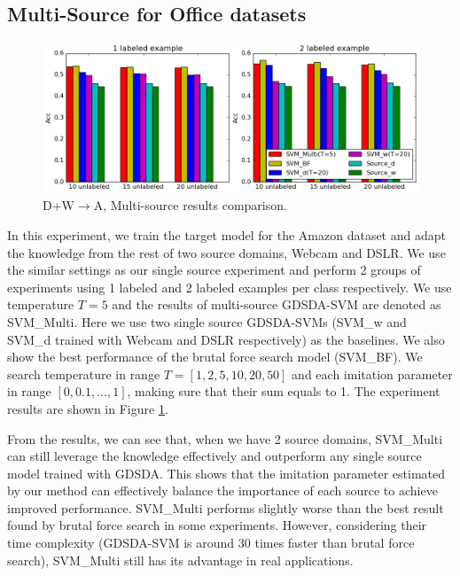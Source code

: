 \subsection{Multi-Source for Office datasets}
\begin{figure}
	\centering
	\includegraphics[scale=.4]{figure/cmp.png}
	\caption{D+W$\rightarrow$A, Multi-source results comparison.}\label{fig:multi}
\end{figure}
In this experiment, we train the target model for the Amazon dataset and adapt the knowledge from the rest of two source domains, Webcam and DSLR.
We use the similar settings as our single source experiment and perform 2 groups of experiments using 1 labeled and 2 labeled examples per class respectively. We use temperature $T=5$ and the results of multi-source GDSDA-SVM are denoted as SVM\_Multi. Here we use two single source GDSDA-SVMs (SVM\_w and SVM\_d trained with Webcam and DSLR respectively) as the baselines. We also show the best performance of the brutal force search model (SVM\_BF). We search temperature in range $T=[1,2,5,10,20,50]$ and each imitation parameter in range $[0,0.1,...,1]$, making sure that their sum equals to 1. The experiment results are shown in Figure \ref{fig:multi}.

From the results, we can see that, when we have 2 source domains, SVM\_Multi can still leverage the knowledge effectively and outperform any single source model trained with GDSDA. This shows that the imitation parameter estimated by our method can effectively balance the importance of each source to achieve improved performance. SVM\_Multi performs slightly worse than the best result found by brutal force search in some experiments. However, considering their time complexity (GDSDA-SVM is around 30 times faster than brutal force search), SVM\_Multi still has its advantage in real applications.




